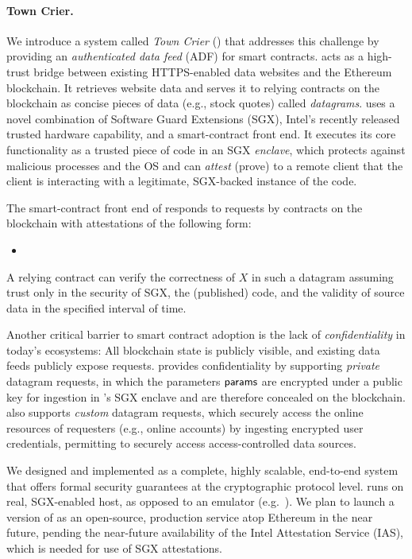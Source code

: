 \paragraph{\bf Town Crier.} We introduce a system called \emph{Town Crier} (\tc) that addresses this challenge by providing an \emph{authenticated data feed} (ADF) for smart contracts. \tc acts as a high-trust bridge between existing HTTPS-enabled data websites and the Ethereum blockchain. It retrieves website data and serves it to relying contracts on the blockchain as concise pieces of data (e.g., stock quotes) called \emph{datagrams}. \tc uses a novel combination of Software Guard Extensions (SGX), Intel's recently released trusted hardware capability, and a smart-contract front end. It executes its core functionality as a trusted piece of code in an SGX \emph{enclave}, which protects against malicious processes and the OS and can \emph{attest} (prove) to a remote client that the client is interacting with a legitimate, SGX-backed instance of the \tc code. 

The smart-contract front end of \tcs responds to requests by contracts on the blockchain with attestations of the following form:

\begin{itemize}[leftmargin=3mm]
\item[]
\end{itemize}

\noindent A relying contract can verify the correctness of $X$ in such a datagram assuming trust only in the security of SGX, the (published) \tc code, and the validity of source data in the specified interval of time. 

Another critical barrier to smart contract adoption is the lack of {\em confidentiality} in today's ecosystems: All blockchain state is publicly visible, and existing data feeds publicly expose requests. \tc provides confidentiality by supporting {\em private} datagram requests, in which the parameters ${\sf params}$ are encrypted under a \tc public key for ingestion in \tc's SGX enclave and are therefore concealed on the blockchain. \tc also supports {\em custom} datagram requests, which securely access the online resources of requesters (e.g., online accounts) by ingesting encrypted user credentials, permitting \tc to securely access access-controlled data sources.

We designed and implemented \tc as a complete, highly scalable, end-to-end system that offers formal security guarantees at the cryptographic protocol level. \tc runs on real, SGX-enabled host, as opposed to an emulator (e.g.~\cite{haven,VC3}). We plan to launch a version of \tc as an open-source, production service atop Ethereum in the near future, pending the near-future availability of the Intel Attestation Service (IAS), which is needed for use of SGX attestations. 

